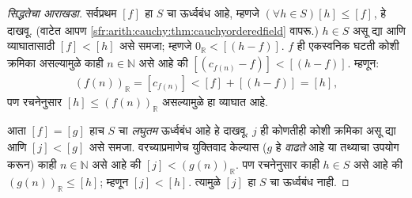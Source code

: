 \documentclass[11pt,a4paper,openany]{book}
\theoremstyle{definition}
\newcommand{\Nat}{\mathbb{N}}
\newcommand{\Real}{\mathbb{R}}
\newcommand{\equivrep}[2]{[#1]_{#2}}
\begin{document}
\begin{proof}[सिद्धतेचा आराखडा]
सर्वप्रथम $\equivrep{f}{}$ हा $S$ चा ऊर्ध्वबंध आहे, म्हणजे
$(\forall h \in S)\equivrep{h}{} \leq \equivrep{f}{}$, हे दाखवू.
(वाटेत आपण \ref{sfr:arith:cauchy:thm:cauchyorderedfield} वापरू.) $h \in S$ असू द्या
आणि व्याघातासाठी $\equivrep{f}{} < \equivrep{h}{}$ असे समजा; म्हणजे
$0_\Real < \equivrep{(h-f)}{}$. $f$ ही एकस्वनिक घटती कोशी क्रमिका
असल्यामुळे काही $n \in \Nat$ असे आहे की
$\equivrep{(c_{f(n)} - f)}{} < \equivrep{(h-f)}{}$. म्हणून:
\[
	(f(n))_\Real = \equivrep{c_{f(n)}}{} < \equivrep{f}{} + \equivrep{(h-f)}{} = \equivrep{h}{},
\]
पण रचनेनुसार $\equivrep{h}{} \leq (f(n))_\Real$ असल्यामुळे हा
व्याघात आहे.

आता $\equivrep{f}{} = \equivrep{g}{}$ हाच $S$ चा \emph{लघुतम}
ऊर्ध्वबंध आहे हे दाखवू. $j$ ही कोणतीही कोशी क्रमिका असू द्या आणि
$\equivrep{j}{} < \equivrep{g}{}$ असे समजा. वरच्याप्रमाणेच युक्तिवाद
केल्यास ($g$ हे \emph{वाढते} आहे या तथ्याचा उपयोग करून) काही $n \in
\Nat$ असे आहे की $\equivrep{j}{} < (g(n))_\Real$. पण रचनेनुसार काही
$h \in S$ असे आहे की $(g(n))_\Real \leq \equivrep{h}{}$; म्हणून
$\equivrep{j}{} < \equivrep{h}{}$. त्यामुळे $\equivrep{j}{}$ हा
$S$ चा ऊर्ध्वबंध नाही.
\end{proof}
\end{document}

